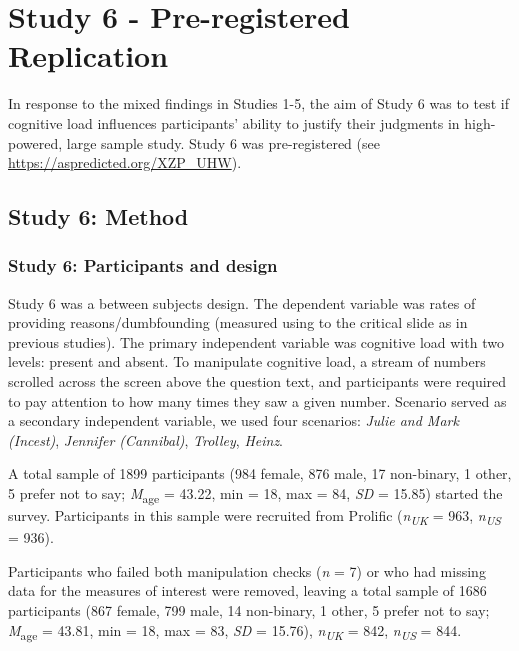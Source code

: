\documentclass[
  american,
  man,floatsintext]{apa7}
\begin{document}
\hypertarget{study-6---pre-registered-replication}{%
\section{Study 6 - Pre-registered Replication}\label{study-6---pre-registered-replication}}

In response to the mixed findings in Studies 1-5, the aim of Study 6 was to test if cognitive load influences participants' ability to justify their judgments in high-powered, large sample study. Study 6 was pre-registered (see \url{https://aspredicted.org/XZP_UHW}).

\hypertarget{study-6-method}{%
\subsection{Study 6: Method}\label{study-6-method}}

\hypertarget{study-6-participants-and-design}{%
\subsubsection{Study 6: Participants and design}\label{study-6-participants-and-design}}

Study 6 was a between subjects design. The dependent variable was rates of providing reasons/dumbfounding (measured using to the critical slide as in previous studies). The primary independent variable was cognitive load with two levels: present and absent. To manipulate cognitive load, a stream of numbers scrolled across the screen above the question text, and participants were required to pay attention to how many times they saw a given number. Scenario served as a secondary independent variable, we used four scenarios: \emph{Julie and Mark (Incest)}, \emph{Jennifer (Cannibal)}, \emph{Trolley}, \emph{Heinz}.

A total sample of 1899 participants (984 female, 876 male, 17 non-binary, 1 other, 5 prefer not to say; \emph{M}\textsubscript{age} = 43.22, min = 18, max = 84, \emph{SD} = 15.85) started the survey. Participants in this sample were recruited from Prolific (\emph{n\textsubscript{UK}} = 963, \emph{n\textsubscript{US}} = 936).

Participants who failed both manipulation checks (\emph{n} = 7) or who had missing data for the measures of interest were removed, leaving a total sample of 1686 participants (867 female, 799 male, 14 non-binary, 1 other, 5 prefer not to say; \emph{M}\textsubscript{age} = 43.81, min = 18, max = 83, \emph{SD} = 15.76), \emph{n\textsubscript{UK}} = 842, \emph{n\textsubscript{US}} = 844.
\end{document}

